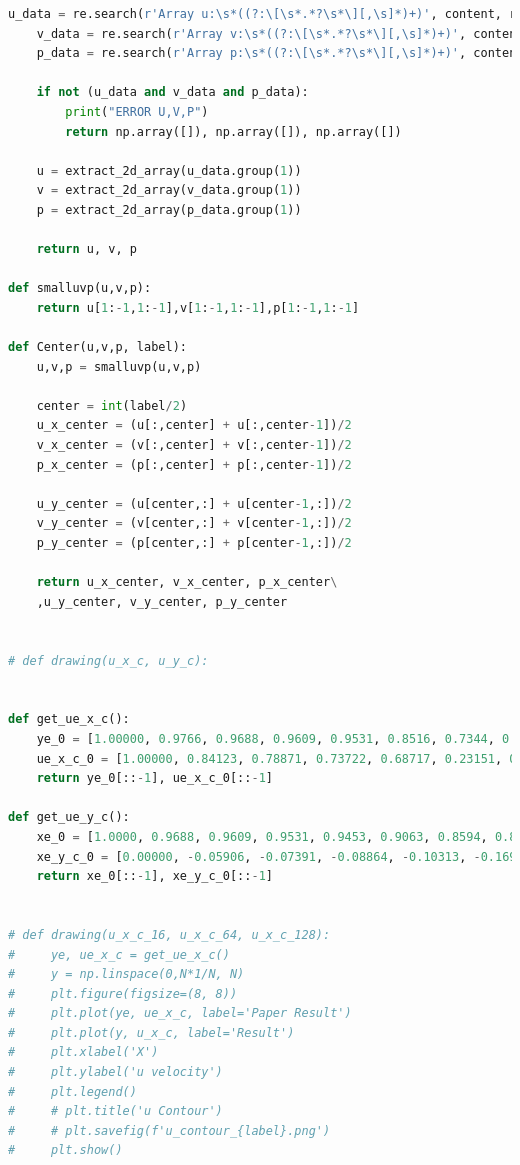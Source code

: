 \documentclass[12pt]{article}
\begin{document}
\begin{scriptsize}
\begin{lstlisting}[language=python,caption={Post Operator:}]
    u_data = re.search(r'Array u:\s*((?:\[\s*.*?\s*\][,\s]*)+)', content, re.DOTALL)
    v_data = re.search(r'Array v:\s*((?:\[\s*.*?\s*\][,\s]*)+)', content, re.DOTALL)
    p_data = re.search(r'Array p:\s*((?:\[\s*.*?\s*\][,\s]*)+)', content, re.DOTALL)

    if not (u_data and v_data and p_data):
        print("ERROR U,V,P")
        return np.array([]), np.array([]), np.array([])

    u = extract_2d_array(u_data.group(1))
    v = extract_2d_array(v_data.group(1))
    p = extract_2d_array(p_data.group(1))

    return u, v, p

def smalluvp(u,v,p):
    return u[1:-1,1:-1],v[1:-1,1:-1],p[1:-1,1:-1] 

def Center(u,v,p, label):
    u,v,p = smalluvp(u,v,p)
    
    center = int(label/2)
    u_x_center = (u[:,center] + u[:,center-1])/2
    v_x_center = (v[:,center] + v[:,center-1])/2
    p_x_center = (p[:,center] + p[:,center-1])/2

    u_y_center = (u[center,:] + u[center-1,:])/2
    v_y_center = (v[center,:] + v[center-1,:])/2
    p_y_center = (p[center,:] + p[center-1,:])/2

    return u_x_center, v_x_center, p_x_center\
    ,u_y_center, v_y_center, p_y_center


# def drawing(u_x_c, u_y_c):
    
    
def get_ue_x_c():
    ye_0 = [1.00000, 0.9766, 0.9688, 0.9609, 0.9531, 0.8516, 0.7344, 0.6172, 0.5000, 0.4531, 0.2813, 0.1719, 0.1016, 0.0703, 0.0625, 0.0547, 0.0000]
    ue_x_c_0 = [1.00000, 0.84123, 0.78871, 0.73722, 0.68717, 0.23151, 0.00332, -0.13641, -0.20581, -0.21090, -0.15662, -0.10150, -0.06434, -0.04775, -0.04192, -0.03717, 0.00000]
    return ye_0[::-1], ue_x_c_0[::-1]

def get_ue_y_c():
    xe_0 = [1.0000, 0.9688, 0.9609, 0.9531, 0.9453, 0.9063, 0.8594, 0.8047, 0.5000, 0.2344, 0.2266, 0.1563, 0.0938, 0.0781, 0.0703, 0.0625, 0.0000]
    xe_y_c_0 = [0.00000, -0.05906, -0.07391, -0.08864, -0.10313, -0.16914, -0.22445, -0.24533, 0.05454, 0.17527, 0.17507, 0.16077, 0.12317, 0.10890, 0.10091, 0.09233, 0.00000]
    return xe_0[::-1], xe_y_c_0[::-1]


# def drawing(u_x_c_16, u_x_c_64, u_x_c_128):
#     ye, ue_x_c = get_ue_x_c()
#     y = np.linspace(0,N*1/N, N)
#     plt.figure(figsize=(8, 8))
#     plt.plot(ye, ue_x_c, label='Paper Result')
#     plt.plot(y, u_x_c, label='Result')
#     plt.xlabel('X')
#     plt.ylabel('u velocity')
#     plt.legend()
#     # plt.title('u Contour')
#     # plt.savefig(f'u_contour_{label}.png')
#     plt.show()



\end{lstlisting}
\end{scriptsize}
\end{document}
